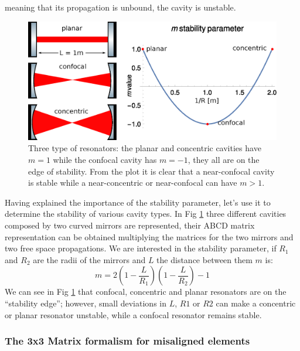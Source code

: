 meaning that its propagation is unbound, the cavity is unstable.
\begin{figure}
	\centering
	\includegraphics[width=1\linewidth]{images/mstability.eps}
	\caption{Three type of resonators: the planar and concentric cavities have $m=1$ while the confocal cavity has $m=-1$, they all are on the edge of stability. From the plot it is clear that a near-confocal cavity is stable while a near-concentric or near-confocal can have $m>1$.}
	\label{fig:mstability}
\end{figure}

Having explained the importance of the stability parameter, let's use it to determine the stability of various cavity types. In Fig \ref{fig:mstability} three different cavities composed by two curved mirrors are represented, their ABCD matrix representation can be obtained multiplying the matrices for the two mirrors and two free space propagations. We are interested in the stability parameter, if $R_1$ and $R_2$ are the radii of the mirrors and $L$ the distance between them $m$ is:
\begin{equation}
m = 2\left( 1- \frac{L}{R_1} \right)\left( 1- \frac{L}{R_2} \right)-1
\end{equation}
We can see in Fig \ref{fig:mstability} that confocal, concentric and planar resonators are on the ``stability edge''; however, small deviations in $L$, $R1$ or $R2$ can make a concentric or planar resonator unstable, while a confocal resonator remains stable.

\subsubsection{The 3x3 Matrix formalism for misaligned elements}


